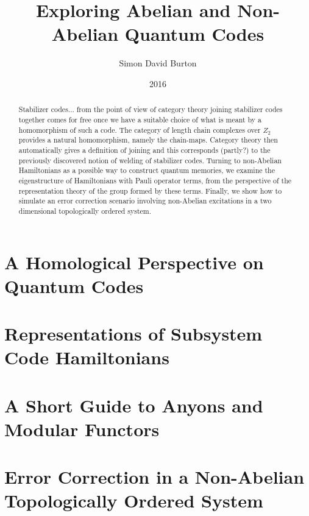 \documentclass[11pt,twoside,openright]{report}
\title{Exploring Abelian and Non-Abelian Quantum Codes}
\author{Simon David Burton}
\date{2016}
\begin{document}
\maketitle


\declaration

\dedication{To my friends}

\begin{abstract}
Stabilizer codes... 
from the point of view of category theory
joining stabilizer codes together comes for free once
we have a suitable choice of what is meant by a
homomorphism of such a code. The category of
length chain complexes over $Z_2$ provides a natural
homomorphism, namely the chain-maps. Category theory
then automatically gives a definition of joining and
this corresponds (partly?) to the previously
discovered notion of welding of stabilizer codes.
Turning to non-Abelian Hamiltonians as a possible
way to construct quantum memories, we examine the
eigenstructure of Hamiltonians with Pauli operator
terms, from the perspective of the representation 
theory of the group formed by these terms.
Finally, we show how to simulate an error
correction scenario involving non-Abelian
excitations in a two dimensional topologically
ordered system.
\end{abstract}

\tableofcontents

\chapter{A Homological Perspective on Quantum Codes}





\chapter{Representations of Subsystem Code Hamiltonians}






\chapter{A Short Guide to Anyons and Modular Functors}



\chapter{Error Correction in a Non-Abelian Topologically Ordered System}





{}

\end{document}

